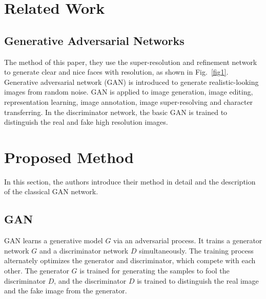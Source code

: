 \documentclass[10pt,twocolumn,letterpaper]{article}
\begin{document}
\section{Related Work}
\subsection{Generative Adversarial Networks}
The method of this paper, they use the super-resolution 
and refinement network to generate clear and nice faces with
resolution, as shown in Fig.~\ref{fig1}. Generative adversarial network (GAN) is introduced to generate realistic-looking images from random noise. GAN is applied to image generation, image editing, representation learning,
image annotation, image super-resolving and character 
transferring. In the discriminator network, the basic 
GAN \cite{goodfellow2014generative} is trained to distinguish the real and fake high resolution images.
\section{Proposed Method}
In this section, the authors introduce their method in detail and the description of the classical GAN network.
\subsection{GAN}
GAN \cite{goodfellow2014generative} learns a generative model $G$ via an adversarial
process. It trains a generator network $G$ and a discriminator network $D$ simultaneously. The training process alternately optimizes the generator and discriminator, which compete with each other. The generator $G$ is trained for generating the samples to fool the discriminator $D$, and the discriminator $D$ is trained to distinguish the real image and the fake
image from the generator.

{\small
	
	
}
\end{document}

